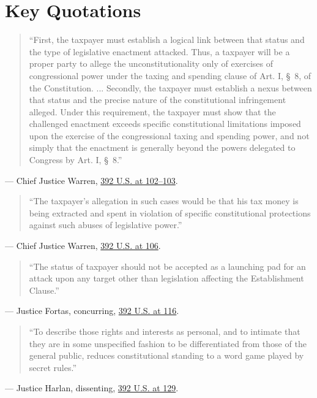 \documentclass[12pt]{article}
\begin{document}
\section{Key Quotations}
\begin{quote}
``First, the taxpayer must establish a logical link between that status and the type of legislative enactment attacked. Thus, a taxpayer will be a proper party to allege the unconstitutionality only of exercises of congressional power under the taxing and spending clause of Art. I, \S\ 8, of the Constitution. ... Secondly, the taxpayer must establish a nexus between that status and the precise nature of the constitutional infringement alleged. Under this requirement, the taxpayer must show that the challenged enactment exceeds specific constitutional limitations imposed upon the exercise of the congressional taxing and spending power, and not simply that the enactment is generally beyond the powers delegated to Congress by Art. I, \S\ 8.''
\end{quote}
\noindent --- Chief Justice Warren, \href{https://supreme.justia.com/cases/federal/us/392/83/}{392 U.S. at 102--103}.

\begin{quote}
``The taxpayer's allegation in such cases would be that his tax money is being extracted and spent in violation of specific constitutional protections against such abuses of legislative power.''
\end{quote}
\noindent --- Chief Justice Warren, \href{https://supreme.justia.com/cases/federal/us/392/83/}{392 U.S. at 106}.

\begin{quote}
``The status of taxpayer should not be accepted as a launching pad for an attack upon any target other than legislation affecting the Establishment Clause.''
\end{quote}
\noindent --- Justice Fortas, concurring, \href{https://supreme.justia.com/cases/federal/us/392/83/}{392 U.S. at 116}.

\begin{quote}
``To describe those rights and interests as personal, and to intimate that they are in some unspecified fashion to be differentiated from those of the general public, reduces constitutional standing to a word game played by secret rules.''
\end{quote}
\noindent --- Justice Harlan, dissenting, \href{https://supreme.justia.com/cases/federal/us/392/83/}{392 U.S. at 129}.
\end{document}
